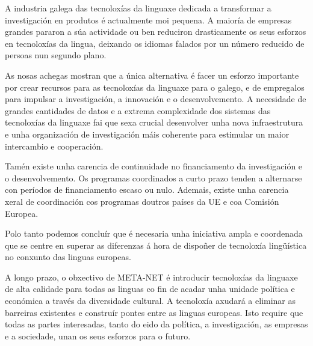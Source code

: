 \begin{multicols}{2}
A industria galega das tecnoloxías da linguaxe dedicada a transformar a investigación en produtos é actualmente moi pequena. A maioría de empresas grandes pararon a súa actividade ou ben reduciron drasticamente os seus esforzos en tecnoloxías da lingua, deixando os idiomas falados por un número reducido de persoas nun segundo plano.

As nosas achegas mostran que a única alternativa é facer un esforzo importante por crear recursos para as tecnoloxías da linguaxe para o galego, e de empregalos para impulsar a investigación, a innovación e o desenvolvemento. A necesidade de grandes cantidades de datos e a extrema complexidade dos sistemas das tecnoloxías da linguaxe fai que sexa crucial desenvolver unha nova infraestrutura e unha organización de investigación máis coherente para estimular un maior intercambio e cooperación.

Tamén existe unha carencia de continuidade no financiamento da investigación e o desenvolvemento. Os programas coordinados a curto prazo tenden a alternarse con períodos de financiamento escaso ou nulo. Ademais, existe unha carencia xeral de coordinación cos programas doutros países da UE e coa Comisión Europea.

Polo tanto podemos concluír que é necesaria unha iniciativa ampla e coordenada que se centre en superar as diferenzas á hora de dispoñer de tecnoloxía lingüística no conxunto das linguas europeas.

A longo prazo, o obxectivo de META-NET é introducir tecnoloxías da linguaxe de alta calidade para todas as linguas co fin de acadar unha unidade política e económica a través da diversidade cultural. A tecnoloxía axudará a eliminar as barreiras existentes e construír pontes entre as linguas europeas. Isto require que todas as partes interesadas, tanto do eido da política, a investigación, as empresas e a sociedade, unan os seus esforzos para o futuro.



\end{multicols}

\cleardoublepage



